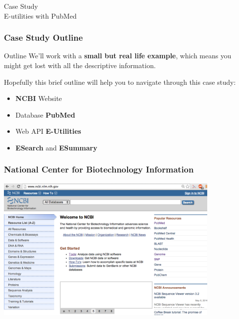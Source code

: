 \documentclass{beamer}\usepackage[]{graphicx}\usepackage[]{color}
\begin{document}

\begin{frame}
 \begin{center}
  \Huge{\textcolor{mandarina}{Case Study \\ E-utilities with PubMed}}
 \end{center}
\end{frame}


\begin{frame}
\frametitle{Case Study Outline}

\begin{block}{Outline}
We'll work with a \textbf{small but real life example}, which means you might get lost with all the descriptive information. 

\bigskip
Hopefully this brief outline will help you to navigate through this case study:
\begin{itemize}
 \item \textbf{NCBI} Website
 {\scriptsize {}}
 \item Database \textbf{PubMed}
 {\scriptsize {}}
 \item Web API \textbf{E-Utilities} 
 {\scriptsize {}}
 \item \textbf{ESearch} and \textbf{ESummary}
 {\scriptsize {}}
\end{itemize}
\end{block}

\end{frame}


\begin{frame}
\frametitle{National Center for Biotechnology Information}

\begin{center}
\includegraphics[width=11cm]{images/ncbi_webpage.png}
\end{center}

\end{frame}
\end{document}
